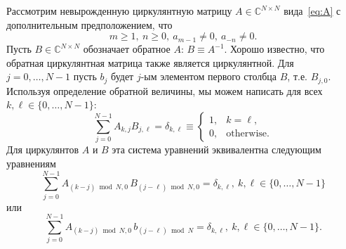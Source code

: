Рассмотрим невырожденную циркулянтную матрицу $A \in \mathbb{C}^{N\times N}$ вида~\eqref{eq:A} с дополнительным предположением, что
\[
m \ge 1,~n \ge 0,~a_{m-1} \neq 0,~a_{-n} \neq 0.
\]
Пусть $B \in \mathbb{C}^{N \times N}$ обозначает обратное $A$: $B \equiv A^{-1}$.
Хорошо известно, что обратная циркулянтная матрица также является циркулянтной.
Для $j = 0, \dots, N-1$ пусть $b_{j}$ будет $j$-ым элементом первого столбца $B$, т.е. $B_{j, 0}$.
%
Используя определение обратной величины, мы можем написать для всех $k,\ell \in \{0,\dots,N-1\}$:
\[
\sum_{j=0}^{N-1} A_{k, j}B_{j,\ell}
=
\delta_{k,\ell}
\equiv
\begin{cases}
1, &k=\ell, \\
0, &\text{otherwise}.
\end{cases}
\]
Для циркулянтов $A$ и $B$ эта система уравнений эквивалентна следующим уравнениям
\[
\sum_{j=0}^{N-1} A_{(k-j) \bmod N, 0}\, B_{(j-\ell)\bmod N, 0}
=
\delta_{k,\ell},~k,\ell \in \{0,\dots, N-1\}
\]
или
\begin{equation}\label{eq:inverse}
\sum_{j=0}^{N-1} A_{(k-j) \bmod N, 0}\,b_{(j-\ell)\bmod N}
=
\delta_{k,\ell},
~k,\ell \in \{0,\dots,N-1\}.
\end{equation}
